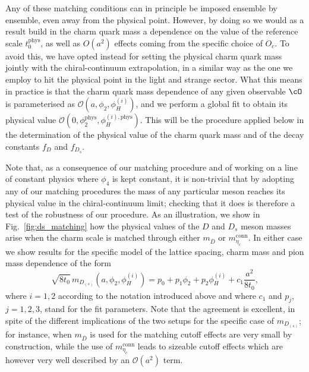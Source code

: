 %
Any of these matching conditions can in principle be imposed ensemble by ensemble,
even away from the physical point.
%
However, by doing so we would as a result build in the charm quark mass a dependence on the value of
the reference scale $t_0^{\mathrm{phys}}$, as well as $O(a^2)$ effects coming from the
specific choice of $O_c$.
%
To avoid this, we have opted instead for setting the physical charm quark mass
jointly with the chiral-continuum
extrapolation, in a similar way as the one we employ to hit the physical point in the
light and strange sector.
%
What this means in practice is that the charm quark mass dependence of any given observable
$\cO$ is parameterised as $\mathcal{O}(a, \phi_2, \phi_H^{(i)})$, and we perform a global
fit to obtain its physical value $\mathcal{O}(0, \phi_2^{\mathrm{phys}}, \phi_H^{(i),\mathrm{phys}})$.
%
This will be the procedure applied below in the determination of the physical value of
the charm quark mass and of the decay constants $f_D$ and $f_{D_s}$.
%

%
Note that, as a consequence of our matching procedure and of working on a line of constant
physics where $\phi_4$ is kept constant, it is non-trivial that by adopting any of our 
matching procedures the mass of any particular meson reaches its physical value in the
chiral-continuum limit;
checking that it does is therefore a test of the robustness of our procedure.
%
As an illustration, we show in Fig.~\ref{fig:ds_matching} how the physical values
of the $D$ and $D_s$ meson masses arise when the charm scale is matched through either
$m_{\overline D}$ or $m_{\eta_c}^{\mathrm{conn}}$.
%
In either case we show results for the specific model of the lattice spacing, charm mass and pion mass
dependence of the form
\begin{equation}
\sqrt{8t_0}\, m_{D_{(s)}}(a, \phi_2, \phi_H^{(i)}) = p_0 + p_1\phi_2 +  p_2 \phi_H^{(i)} + c_1\frac{a^2}{8t_0},
\end{equation}
where $i=1,2$ according to the notation introduced above and where $c_1$ and $p_j$, $j=1,2,3$, stand for the fit parameters.
%
Note that the agreement is excellent, in spite of the different implications of the
two setups for the specific case of $m_{D_{(s)}}$; for instance, when $m_{\overline D}$ is used
for the matching cutoff effects are very small by construction, while the use of
$m_{\eta_c}^{\mathrm{conn}}$ leads to sizeable cutoff effects which are however
very well described by an $\mathcal{O}(a^2)$ term.


